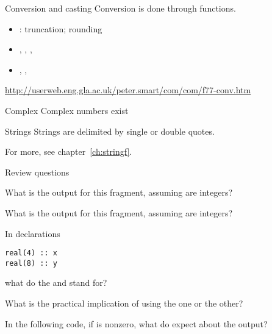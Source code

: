 \begin{block}{Conversion and casting}
  Conversion is done through functions.
  \begin{itemize}
  \item {}: truncation;  rounding
  \item {}, , , 
  \item {}, , 
  \end{itemize}
\url{http://userweb.eng.gla.ac.uk/peter.smart/com/com/f77-conv.htm}
\end{block}

\begin{block}{Complex}
  Complex numbers exist
\end{block}

\begin{block}{Strings}
  Strings are delimited by single or double quotes.

  For more, see chapter~\ref{ch:stringf}.
\end{block}

 {Review questions}

\begin{exercise}
  What is the output for this fragment, assuming  are integers?
\end{exercise}

\begin{exercise}
  What is the output for this fragment, assuming  are integers?
\end{exercise}

\begin{exercise}
  \label{ex:f-elt-rev1}
  In declarations
\begin{verbatim}
real(4) :: x
real(8) :: y
\end{verbatim}
what do the  and  stand for?

What is the practical implication of using the one or the other?
\end{exercise}

\begin{exercise}
  \label{ex:f-elt-rev2}
  In the following code, if  is nonzero, what do expect about
  the output?
\end{exercise}
